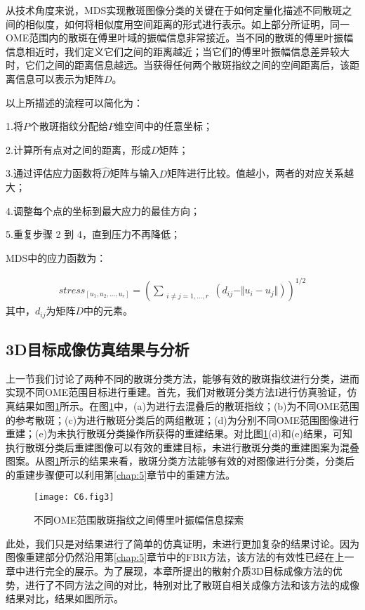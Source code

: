 从技术角度来说，MDS实现散斑图像分类的关键在于如何定量化描述不同散斑之间的相似度，如何将相似度用空间距离的形式进行表示。如上部分所证明，同一OME范围内的散斑在傅里叶域的振幅信息非常接近。当不同的散斑的傅里叶振幅信息相近时，我们定义它们之间的距离越近；当它们的傅里叶振幅信息差异较大时，它们之间的距离信息越远。当获得任何两个散斑指纹之间的空间距离后，该距离信息可以表示为矩阵$D$。

以上所描述的流程可以简化为：\par
1.将$P$个散斑指纹分配给$P$维空间中的任意坐标；\par
2.计算所有点对之间的距离，形成$D$矩阵；\par
3.通过评估应力函数将$\hat{D}$矩阵与输入$D$矩阵进行比较。值越小，两者的对应关系越大；\par
4.调整每个点的坐标到最大应力的最佳方向；\par
5.重复步骤 2 到 4，直到压力不再降低；\par

MDS中的应力函数为：

\begin{equation}
\begin{aligned}
stress_{[u_1,u_2,\ldots, u_r]} =\left( \sum_{\substack{i\neq j = 1,\ldots,r} } (d_{ij}-\Vert u_{i}- u_{j} \Vert ) \right)^{1/2}
\label{eq:6.6}
\end{aligned}
\end{equation}
其中，$d_{ij}$为矩阵$D$中的元素。

\subsection{3D目标成像仿真结果与分析}

上一节我们讨论了两种不同的散斑分类方法，能够有效的散斑指纹进行分类，进而实现不同OME范围目标进行重建。首先，我们对散斑分类方法I进行仿真验证，仿真结果如图\ref{fig:6.3}所示。在图\ref{fig:6.3}中，(a)为进行去混叠后的散斑指纹；(b)为不同OME范围的参考散斑；(c)为进行散斑分类后的两组散斑；(d)为分别不同OME范围图像进行重建；(e)为未执行散斑分类操作所获得的重建结果。对比图\ref{fig:6.3}(d)和(e)结果，可知执行散斑分类后重建图像可以有效的重建目标，未进行散斑分类的重建图案为混叠图案。从图\ref{fig:6.3}所示的结果来看，散斑分类方法能够有效的对图像进行分类，分类后的重建步骤便可以利用第\ref{chap:5}章节中的重建方法。

\begin{figure}[htp]
	\centering
	\texttt{[image: C6.fig3]}
	\caption{不同OME范围散斑指纹之间傅里叶振幅信息探索}
	\label{fig:6.3}
\end{figure}

此处，我们只是对结果进行了简单的仿真证明，未进行更加复杂的结果讨论。因为图像重建部分仍然沿用第\ref{chap:5}章节中的FBR方法，该方法的有效性已经在上一章中进行完全的展示。为了展现，本章所提出的散射介质3D目标成像方法的优势，进行了不同方法之间的对比，特别对比了散斑自相关成像方法和该方法的成像结果对比，结果如图所示。
